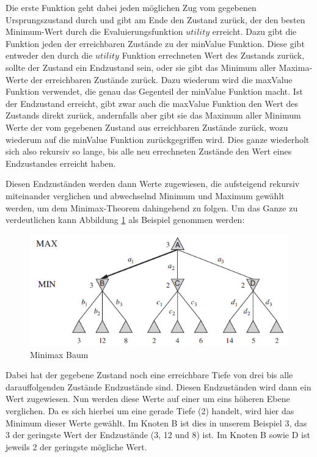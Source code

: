 Die erste Funktion geht dabei jeden möglichen Zug vom gegebenen Ursprungszustand durch und gibt am Ende den Zustand zurück, der den besten Minimum-Wert durch die Evaluierungsfunktion $utility$ erreicht. Dazu gibt die Funktion jeden der erreichbaren Zustände zu der minValue Funktion. Diese gibt entweder den durch die $utility$ Funktion errechneten Wert des Zustands zurück, sollte der Zustand ein Endzustand sein, oder sie gibt das Minimum aller Maxima-Werte der erreichbaren Zustände zurück. Dazu wiederum wird die maxValue Funktion verwendet, die genau das Gegenteil der minValue Funktion macht. Ist der Endzustand erreicht, gibt zwar auch die maxValue Funktion den Wert des Zustands direkt zurück, andernfalls aber gibt sie das Maximum aller Minimum Werte der vom gegebenen Zustand aus erreichbaren Zustände zurück, wozu wiederum auf die minValue Funktion zurückgegriffen wird. Dies ganze wiederholt sich also rekursiv so lange, bis alle neu errechneten Zustände den Wert eines Endzustandes erreicht haben. \cite{Russell2010}

Diesen Endzuständen werden dann Werte zugewiesen, die aufsteigend rekursiv miteinander verglichen und abwechselnd Minimum und Maximum gewählt werden, um dem Minimax-Theorem dahingehend zu folgen. Um das Ganze zu verdeutlichen kann Abbildung \ref{fig:minimax_tree} als Beispiel genommen werden:

\begin{figure}[h]
\centering
\includegraphics[width=\textwidth/5*4]{images/minimax_algorithm_tree.PNG}

\caption{Minimax Baum \cite{Russell2010}}\label{fig:minimax_tree}
\end{figure}

Dabei hat der gegebene Zustand noch eine erreichbare Tiefe von drei bis alle darauffolgenden Zustände Endzustände sind. Diesen Endzuständen wird dann ein Wert zugewiesen. Nun werden diese Werte auf einer um eins höheren Ebene verglichen. Da es sich hierbei um eine gerade Tiefe (2) handelt, wird hier das Minimum dieser Werte gewählt. Im Knoten B ist dies in unserem Beispiel 3, das 3 der geringste Wert der Endzustände (3, 12 und 8) ist. Im Knoten B sowie D ist jeweils 2 der geringste mögliche Wert. 

